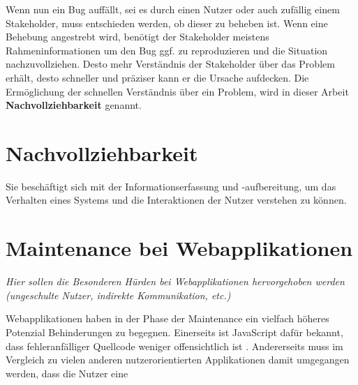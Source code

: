 	Wenn nun ein Bug auffällt, sei es durch einen Nutzer oder auch zufällig einem Stakeholder, muss entschieden werden, ob dieser zu beheben ist. Wenn eine Behebung angestrebt wird, benötigt der Stakeholder meistens Rahmeninformationen \cite{WhatMakesAGoodBugReport} um den Bug ggf. zu reproduzieren und die Situation nachzuvollziehen. Desto mehr Verständnis der Stakeholder über das Problem erhält, desto schneller und präziser kann er die Ursache aufdecken. Die Ermöglichung der schnellen Verständnis über ein Problem, wird in dieser Arbeit \textbf{Nachvollziehbarkeit} genannt.

\section{Nachvollziehbarkeit}

	Sie beschäftigt sich mit der Informationserfassung und -aufbereitung, um das Verhalten eines Systems und die Interaktionen der Nutzer verstehen zu können.

\section{Maintenance bei Webapplikationen}

	\textit{Hier sollen die Besonderen Hürden bei Webapplikationen hervorgehoben werden (ungeschulte Nutzer, indirekte Kommunikation, etc.)}
	
	Webapplikationen haben in der Phase der Maintenance ein vielfach höheres Potenzial Behinderungen zu begegnen. Einerseits  ist JavaScript dafür bekannt, dass fehleranfälliger Quellcode weniger offensichtlich ist \cite{BuildingStableWebApplications} \cite{BugsJSABenchmarkOfJavaScriptBugs}. Andererseits muss im Vergleich zu vielen anderen nutzerorientierten Applikationen damit umgegangen werden, dass die Nutzer eine